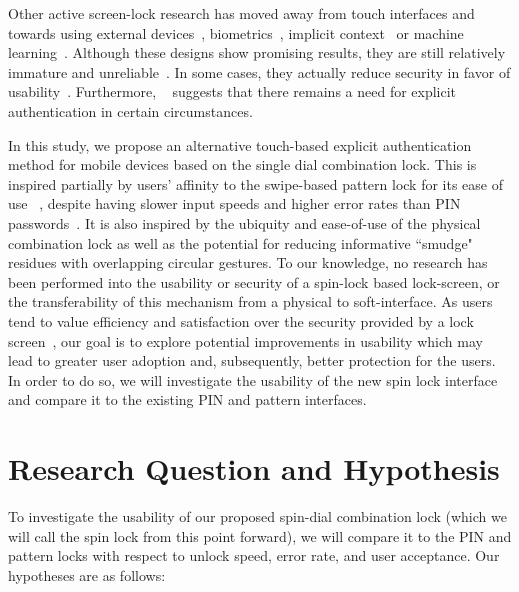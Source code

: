 \documentclass{sigchi}
\begin{document}
Other active screen-lock research has moved away from touch interfaces and towards using external devices~\cite{winkler_glass_2015}, biometrics~\cite{clarke_advanced_2007}, implicit context~\cite{micallef_why_2015,schloglhofer_secure_2012,von_zezschwitz_patterns_2013} or machine learning~\cite{riva_progressive_2012}. Although these designs show promising results, they are still relatively immature and unreliable~\cite{schneegass_smudgesafe:_2014}. In some cases, they actually reduce security in favor of usability~\cite{khan_itus:_2014, micallef_why_2015}. Furthermore,  ~\cite{riva_progressive_2012} suggests that there remains a need for explicit authentication in certain circumstances.

In this study, we propose an alternative touch-based explicit authentication method for mobile devices based on the single dial combination lock. This is inspired partially by users' affinity to the swipe-based pattern lock for its ease of use ~\cite{van_bruggen_modifying_2013}, despite having slower input speeds and higher error rates than PIN passwords~\cite{von_zezschwitz_patterns_2013}. It is also inspired by the ubiquity and ease-of-use of the physical combination lock as well as the potential for reducing informative ``smudge" residues with overlapping circular gestures. To our knowledge, no research has been performed into the usability or security of a spin-lock based lock-screen, or the transferability of this mechanism from a physical to soft-interface. As users tend to value efficiency and satisfaction over the security provided by a lock screen~\cite{micallef_why_2015}, our goal is to explore potential improvements in usability which may lead to greater user adoption and, subsequently, better protection for the users. In order to do so, we will investigate the usability of the new spin lock interface and compare it to the existing PIN and pattern interfaces.

\section{Research Question and Hypothesis}
To investigate the usability of our proposed spin-dial combination lock (which we will call the spin lock from this point forward), we will compare it to the PIN and pattern locks with respect to unlock speed, error rate, and user acceptance. Our hypotheses are as follows:
\end{document}

